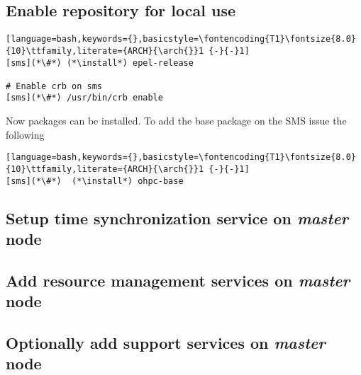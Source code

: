 \documentclass[letterpaper]{article}
\newcommand{\arch}{x86\_64}
\newcommand{\install}{dnf -y install}
\begin{document}
\subsection{Enable \OHPC{} repository for local use} \label{sec:enable_repo}






\begin{lstlisting}[language=bash,keywords={},basicstyle=\fontencoding{T1}\fontsize{8.0}{10}\ttfamily,literate={ARCH}{\arch{}}1 {-}{-}1]
[sms](*\#*) (*\install*) epel-release

# Enable crb on sms
[sms](*\#*) /usr/bin/crb enable
\end{lstlisting}

Now \OHPC{} packages can be installed. To add the base package on the SMS
issue the following
\begin{lstlisting}[language=bash,keywords={},basicstyle=\fontencoding{T1}\fontsize{8.0}{10}\ttfamily,literate={ARCH}{\arch{}}1 {-}{-}1]
[sms](*\#*)  (*\install*) ohpc-base
\end{lstlisting}



\subsection{Setup time synchronization service on {\em master} node} \label{sec:add_ntp}


%


\subsection{Add resource management services on {\em master} node} \label{sec:add_rm}


\subsection{Optionally add \InfiniBand{} support services on {\em master} node} \label{sec:add_ofed}

\end{document}
